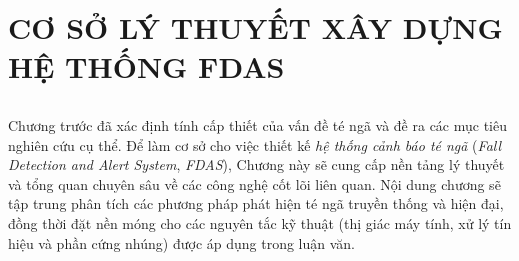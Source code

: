 \chapter{CƠ SỞ LÝ THUYẾT XÂY DỰNG HỆ THỐNG FDAS} 
\label{chap:theoretical_basis}

\section*{} %

Chương trước đã xác định tính cấp thiết của vấn đề té ngã và đề ra các mục tiêu nghiên cứu cụ thể.  
Để làm cơ sở cho việc thiết kế \emph{hệ thống cảnh báo té ngã} (\emph{Fall Detection and Alert System}, \emph{FDAS}), Chương này sẽ cung cấp nền tảng lý thuyết và tổng quan chuyên sâu về các công nghệ cốt lõi liên quan.  
Nội dung chương sẽ tập trung phân tích các phương pháp phát hiện té ngã truyền thống và hiện đại, đồng thời đặt nền móng cho các nguyên tắc kỹ thuật (thị giác máy tính, xử lý tín hiệu và phần cứng nhúng) được áp dụng trong luận văn.






